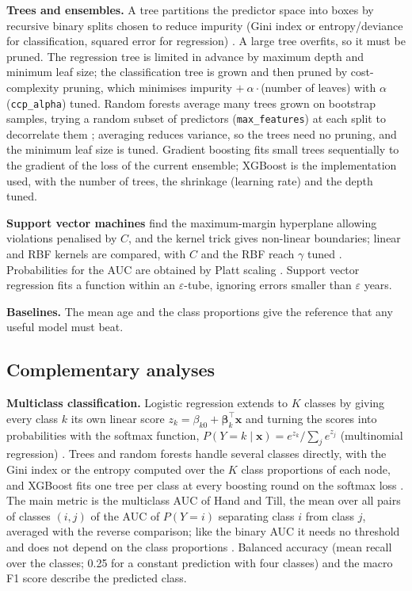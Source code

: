 \textbf{Trees and ensembles.} A tree partitions the predictor space into boxes by recursive binary
splits chosen to reduce impurity (Gini index or entropy/deviance for classification, squared error for
regression) \cite{breiman1984}. A large tree overfits, so it must be pruned. The regression tree is
limited in advance by maximum depth and minimum leaf size; the classification tree is grown and then
pruned by cost-complexity pruning, which minimises impurity $+\ \alpha\cdot$(number of leaves) with
$\alpha$ (\texttt{ccp\_alpha}) tuned. Random forests average many trees grown on bootstrap samples,
trying a random subset of predictors (\texttt{max\_features}) at each split to decorrelate them
\cite{breiman2001}; averaging reduces variance, so the trees need no pruning, and the minimum leaf size
is tuned. Gradient boosting fits small trees sequentially to the gradient of the loss of the current
ensemble; XGBoost \cite{chen2016} is the implementation used, with the number of trees, the shrinkage
(learning rate) and the depth tuned.

\textbf{Support vector machines} find the maximum-margin hyperplane allowing violations penalised by
$C$, and the kernel trick gives non-linear boundaries; linear and RBF kernels are compared, with $C$
and the RBF reach $\gamma$ tuned \cite{cortes1995}. Probabilities for the AUC are obtained by Platt
scaling \cite{platt1999}. Support vector regression fits a function within an $\varepsilon$-tube,
ignoring errors smaller than $\varepsilon$ years.

\textbf{Baselines.} The mean age and the class proportions give the reference that any useful model
must beat.

\subsection{Complementary analyses}

\textbf{Multiclass classification.} Logistic regression extends to $K$ classes by giving every class
$k$ its own linear score $z_k = \beta_{k0} + \boldsymbol\beta_k^\top\mathbf x$ and turning the scores
into probabilities with the softmax function, $P(Y=k\mid\mathbf x) = e^{z_k}/\sum_{j} e^{z_j}$
(multinomial regression) \cite{james2021}. Trees and random forests handle several classes directly,
with the Gini index or the entropy computed over the $K$ class proportions of each node, and XGBoost
fits one tree per class at every boosting round on the softmax loss \cite{chen2016}. The main metric is
the multiclass AUC of Hand and Till, the mean over all pairs of classes $(i,j)$ of the AUC of
$P(Y=i)$ separating class $i$ from class $j$, averaged with the reverse comparison; like the binary AUC
it needs no threshold and does not depend on the class proportions \cite{handtill2001}. Balanced
accuracy (mean recall over the classes; 0.25 for a constant prediction with four classes) and the macro
F1 score describe the predicted class.

